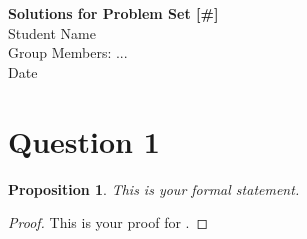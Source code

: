 \documentclass[11pt, oneside]{article}
\newtheorem{proposition}{Proposition}
\theoremstyle{remark}
\begin{document}
\begin{center}
\textbf{Solutions for Problem Set [\#]}\\
Student Name\\
Group Members:  ... \\
Date
\end{center}

\section*{Question 1}

\begin{proposition}\label{q1} This is your formal statement.
\end{proposition}

\begin{proof} This is your proof for .
\end{proof}


\end{document}
